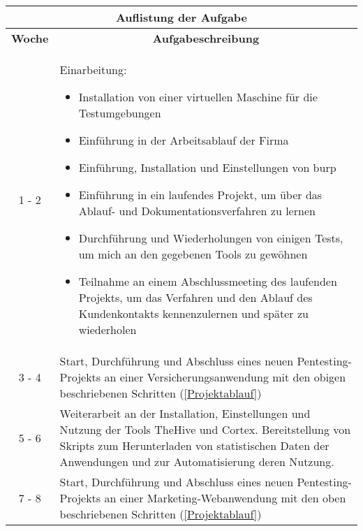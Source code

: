 \begin{table}[H]
    \begin{tabularx}{\textwidth}{|c|X|}
    \toprule
    \multicolumn{2}{c}{\textbf{Auflistung der Aufgabe}} \\
    \midrule
    \multicolumn{1}{c}{\textbf{Woche}} & \multicolumn{1}{c}{\textbf{Aufgabeschreibung}} \\
    \hline
    1 - 2    & Einarbeitung:
                \begin{itemize}
                    \item Installation von einer virtuellen Maschine für die Testumgebungen
                    \item Einführung in der Arbeitsablauf der Firma
                    \item Einführung, Installation und Einstellungen von \gls{burp}
                    \item Einführung in ein laufendes Projekt, um über das Ablauf- und Dokumentationsverfahren zu lernen
                    \item Durchführung und Wiederholungen von einigen Tests, um mich an den gegebenen Tools zu gewöhnen
                    \item Teilnahme an einem Abschlussmeeting des laufenden Projekts, um das Verfahren und den Ablauf des Kundenkontakts kennenzulernen und später zu wiederholen
                \end{itemize} \\
        \hline

    3 - 4       &  Start, Durchführung und Abschluss eines neuen Pentesting-Projekts an einer Versicherungsanwendung mit den obigen beschriebenen Schritten (\ref{Projektablauf})  \\ 
    
    \hline

    5 - 6       & Weiterarbeit an der Installation, Einstellungen und Nutzung der Tools \gls{TheHive} und \gls{Cortex}. Bereitstellung von Skripts zum Herunterladen von statistischen Daten der Anwendungen und zur Automatisierung deren Nutzung.  \\ 

    \hline

    7 - 8      &  Start, Durchführung und Abschluss eines neuen Pentesting-Projekts an einer Marketing-Webanwendung mit den oben beschriebenen Schritten (\ref{Projektablauf}) \\

    \hline


\end{tabularx}
\end{table}
